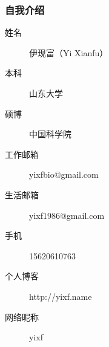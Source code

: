 
\begin{frame}
	\frametitle{自我介绍}
		\begin{description}
			\item[姓\qquad 名]伊现富（Yi Xianfu）
			\item[本\qquad 科]山东大学
			\item[硕\qquad 博]中国科学院
			\item[工作邮箱]yixfbio@gmail.com
			\item[生活邮箱]yixf1986@gmail.com
			\item[手\qquad 机]15620610763
			\item[个人博客]http://yixf.name
			\item[网络昵称]yixf
		\end{description}
\end{frame}

